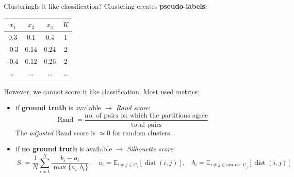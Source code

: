 \begin{frame}{Clustering}{Is it like classification?}
    Clustering creates \textbf{pseudo-labels}:
    \begin{center}
        \begin{tabular}{@{}cccc@{}}
            $x_1$ & $x_2$ & $x_3$ & $K$   \\ \hline
            0.3   & 0.1   & 0.4   & 1     \\
            -0.3  & 0.14  & 0.24  & 2     \\
            -0.4  & 0.12  & 0.26  & 2     \\
            \dots & \dots & \dots & \dots
        \end{tabular}
    \end{center}

    \vfill \pause

    However, we cannot score it like classification.
    Most used metrics:
    \begin{itemize}
        \item if \textbf{ground truth} is available $\rightarrow$ \emph{Rand score}:
              \begin{equation*}
                  \operatorname{Rand} = \frac{\text{no.\ of pairs on which the partitions agree}}{\text{total pairs}}
              \end{equation*}
              {\footnotesize The \emph{adjusted} Rand score is $\simeq 0$ for random clusters.}
        \item if \textbf{no ground truth} is available $\rightarrow$ \emph{Silhouette score}:
              \begin{equation*}
                  \operatorname{S} = \frac{1}{N} \sum\limits_{i = 1}^N \frac{b_i - a_i}{\max\{ a_i, b_i \}},
                  \quad
                  a_i = \mathbb{E}_{i \neq j \in C_i}\left[ \operatorname{dist}(i, j) \right],
                  \quad
                  b_i = \mathbb{E}_{i \neq j \in \text{nearest~}C_j}\left[ \operatorname{dist}(i, j) \right]
              \end{equation*}
    \end{itemize}
\end{frame}

